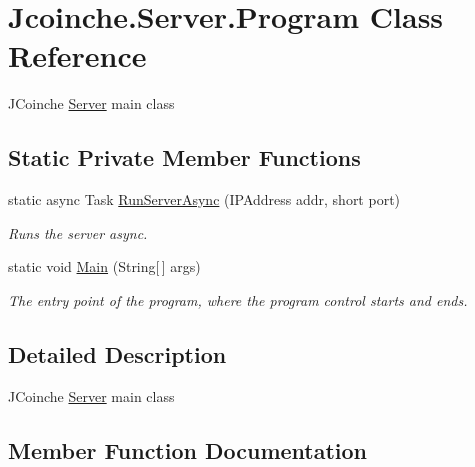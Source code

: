 \hypertarget{class_jcoinche_1_1_server_1_1_program}{}\section{Jcoinche.\+Server.\+Program Class Reference}
\label{class_jcoinche_1_1_server_1_1_program}


J\+Coinche \hyperlink{namespace_jcoinche_1_1_server}{Server} main class  


\subsection*{Static Private Member Functions}
\begin{DoxyCompactItemize}
\item 
static async Task \hyperlink{class_jcoinche_1_1_server_1_1_program_a02ccbf10fb4a4a1dee93783809a0a5f9}{Run\+Server\+Async} (I\+P\+Address addr, short port)
\begin{DoxyCompactList}\small\item\em Runs the server async. \end{DoxyCompactList}\item 
static void \hyperlink{class_jcoinche_1_1_server_1_1_program_a0ee0acd38bcf9cbca10484f7d87d5053}{Main} (String\mbox{[}$\,$\mbox{]} args)
\begin{DoxyCompactList}\small\item\em The entry point of the program, where the program control starts and ends. \end{DoxyCompactList}\end{DoxyCompactItemize}


\subsection{Detailed Description}
J\+Coinche \hyperlink{namespace_jcoinche_1_1_server}{Server} main class 



\subsection{Member Function Documentation}
\mbox{\label{class_jcoinche_1_1_server_1_1_program_a0ee0acd38bcf9cbca10484f7d87d5053}} 
